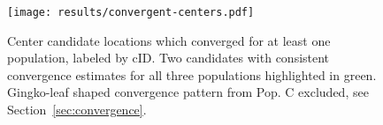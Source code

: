 \begin{figure}
    \texttt{[image: results/convergent-centers.pdf]}%
    \caption[Convergent center locations]{Center candidate locations which converged for at least one population, labeled by cID. Two candidates with consistent convergence estimates for all three populations highlighted in green. Gingko-leaf shaped convergence pattern from Pop. C excluded, see Section~\ref{sec:convergence}.}
\end{figure}



